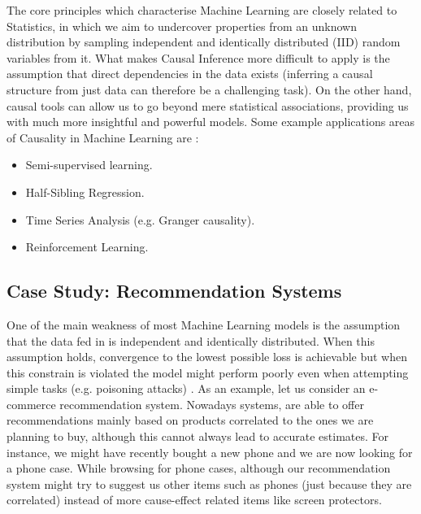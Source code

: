 The core principles which characterise Machine Learning are closely related to Statistics, in which we aim to undercover properties from an unknown distribution by sampling independent and identically distributed (IID) random variables from it. What makes Causal Inference more difficult to apply is the assumption that direct dependencies in the data exists (inferring a causal structure from just data can therefore be a challenging task). On the other hand, causal tools can allow us to go beyond mere statistical associations, providing us with much more insightful and powerful models. Some example applications areas of Causality in Machine Learning are \cite{ml_peters}:
\begin{itemize}
    \item Semi-supervised learning.
    \item Half-Sibling Regression.
    \item Time Series Analysis (e.g. Granger causality).
    \item Reinforcement Learning.
\end{itemize}

\subsection{Case Study: Recommendation Systems}

One of the main weakness of most Machine Learning models is the assumption that the data fed in is independent and identically distributed. When this assumption holds, convergence to the lowest possible loss is achievable but when this constrain is violated the model might perform poorly even when attempting simple tasks (e.g. poisoning attacks) \cite{six}.
As an example, let us consider an e-commerce recommendation system. Nowadays systems, are able to offer recommendations mainly based on products correlated to the ones we are planning to buy, although this cannot always lead to accurate estimates. For instance, we might have recently bought a new phone and we are now looking for a phone case. While browsing for phone cases, although our recommendation system might try to suggest us other items such as phones (just because they are correlated) instead of more cause-effect related items like screen protectors.